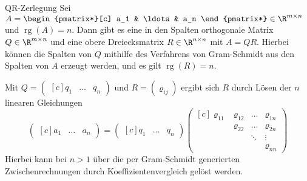 \documentclass[german]{../spicker}
\newcommand{\vektor}[1]{\begin{pmatrix*}[c] #1 \end{pmatrix*}}
\newcommand{\rg}{\operatorname{rg}}
\begin{document}
\begin{algo}{QR-Zerlegung}
    Sei $A = \vektor{a_1 & \ldots & a_n} \in \R^{m\times n}$ und $\rg(A) = n$.
    Dann gibt es eine in den Spalten orthogonale Matrix $Q \in \R^{m\times n}$ und eine obere Dreiecksmatrix $R \in \R^{n\times n}$ mit $A = QR$.
    Hierbei können die Spalten von $Q$ mithilfe des Verfahrens von Gram-Schmidt aus den Spalten von $A$ erzeugt werden, und es gilt $\rg(R) = n$.

    Mit $Q = \vektor{q_1 & \ldots & q_n}$ und $R = (\varrho_{ij})$ ergibt sich $R$ durch Lösen der $n$ linearen Gleichungen
    $$
        \vektor{a_1 & \ldots & a_n} = \vektor{q_1 & \ldots & q_n} \vektor{ \varrho_{11} & \varrho_{12} & \ldots & \varrho_{1n} \\ & \varrho_{22} & \ldots & \varrho_{2n} \\ & & \ddots & \vdots \\ & & & \varrho_{nn}}
    $$
    Hierbei kann bei $n > 1$ über die per Gram-Schmidt generierten Zwischenrechnungen durch Koeffizientenvergleich gelöst werden.
\end{algo}
\end{document}
